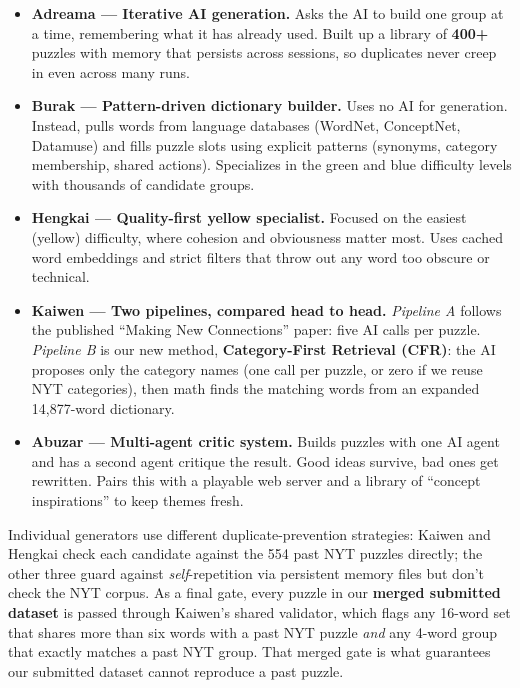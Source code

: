 \documentclass[11pt, letterpaper]{article}
\begin{document}
\begin{itemize}[leftmargin=*, itemsep=0.25em]
\item \textbf{Adreama --- Iterative AI generation.} Asks the AI to build one
group at a time, remembering what it has already used. Built up a library of
\textbf{400+} puzzles with memory that persists across sessions, so duplicates
never creep in even across many runs.

\item \textbf{Burak --- Pattern-driven dictionary builder.} Uses no AI for
generation. Instead, pulls words from language databases (WordNet, ConceptNet,
Datamuse) and fills puzzle slots using explicit patterns (synonyms,
category membership, shared actions). Specializes in the green and blue
difficulty levels with thousands of candidate groups.

\item \textbf{Hengkai --- Quality-first yellow specialist.} Focused on the
easiest (yellow) difficulty, where cohesion and obviousness matter most. Uses
cached word embeddings and strict filters that throw out any word too obscure
or technical.

\item \textbf{Kaiwen --- Two pipelines, compared head to head.}
\emph{Pipeline A} follows the published ``Making New Connections'' paper: five
AI calls per puzzle. \emph{Pipeline B} is our new method, \textbf{Category-First
Retrieval (CFR)}: the AI proposes only the category names (one call per puzzle,
or zero if we reuse NYT categories), then math finds the matching words from an
expanded 14{,}877-word dictionary.

\item \textbf{Abuzar --- Multi-agent critic system.} Builds puzzles with one AI
agent and has a second agent critique the result. Good ideas survive, bad ones
get rewritten. Pairs this with a playable web server and a library of ``concept
inspirations'' to keep themes fresh.
\end{itemize}

Individual generators use different duplicate-prevention strategies:
Kaiwen and Hengkai check each candidate against the 554 past NYT puzzles
directly; the other three guard against \emph{self}-repetition via persistent
memory files but don't check the NYT corpus. As a final gate, every puzzle in
our \textbf{merged submitted dataset} is passed through Kaiwen's shared
validator, which flags any 16-word set that shares more than six words with a
past NYT puzzle \emph{and} any 4-word group that exactly matches a past NYT
group. That merged gate is what guarantees our submitted dataset cannot
reproduce a past puzzle.
\end{document}
